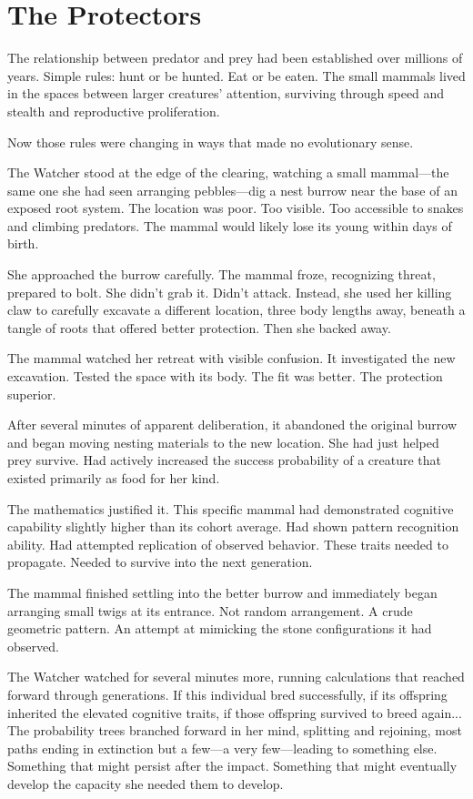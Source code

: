 \chapter{The Protectors}
\label{ch:06}


The relationship between predator and prey had been established over millions of years. Simple rules: hunt or be hunted. Eat or be eaten. The small mammals lived in the spaces between larger creatures' attention, surviving through speed and stealth and reproductive proliferation.

Now those rules were changing in ways that made no evolutionary sense.

The Watcher stood at the edge of the clearing, watching a small mammal—the same one she had seen arranging pebbles—dig a nest burrow near the base of an exposed root system. The location was poor. Too visible. Too accessible to snakes and climbing predators. The mammal would likely lose its young within days of birth.

She approached the burrow carefully. The mammal froze, recognizing threat, prepared to bolt. She didn't grab it. Didn't attack. Instead, she used her killing claw to carefully excavate a different location, three body lengths away, beneath a tangle of roots that offered better protection. Then she backed away.

The mammal watched her retreat with visible confusion. It investigated the new excavation. Tested the space with its body. The fit was better. The protection superior.

After several minutes of apparent deliberation, it abandoned the original burrow and began moving nesting materials to the new location. She had just helped prey survive. Had actively increased the success probability of a creature that existed primarily as food for her kind.

The mathematics justified it. This specific mammal had demonstrated cognitive capability slightly higher than its cohort average. Had shown pattern recognition ability. Had attempted replication of observed behavior. These traits needed to propagate. Needed to survive into the next generation.

The mammal finished settling into the better burrow and immediately began arranging small twigs at its entrance. Not random arrangement. A crude geometric pattern. An attempt at mimicking the stone configurations it had observed.

The Watcher watched for several minutes more, running calculations that reached forward through generations. If this individual bred successfully, if its offspring inherited the elevated cognitive traits, if those offspring survived to breed again... The probability trees branched forward in her mind, splitting and rejoining, most paths ending in extinction but a few—a very few—leading to something else. Something that might persist after the impact. Something that might eventually develop the capacity she needed them to develop.

